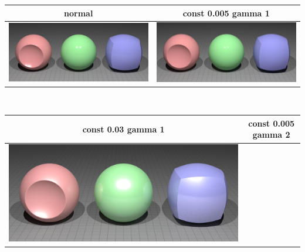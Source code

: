 \documentclass[11pt]{article}
\begin{document}
\begin{table}[ht]
  \centering
  \begin{tabular}{ | c | c |}
    \hline
    normal & const 0.005 gamma 1 \\ \hline
    \begin{minipage}{.455\textwidth}
      \includegraphics[scale=0.15]{img/obj/basic_pl/basic_pl.jpg}
    \end{minipage}
    &
    \begin{minipage}{.455\textwidth}
      \includegraphics[scale=0.15]{img/obj/basic_pl/basic_pl_disney_dg1_dc005.jpg}
    \end{minipage}
    \\ \hline
  \end{tabular}\\
  \begin{tabular}{ | c | c |}
    \hline
    const 0.03 gamma 1 & const 0.005 gamma 2 \\ \hline
    \begin{minipage}{.455\textwidth}
      \includegraphics[scale=0.15]{img/obj/basic_pl/basic_pl_disney_dc03_dg1.jpg}

\end{minipage}
\end{tabular}
\end{table}
\end{document}
